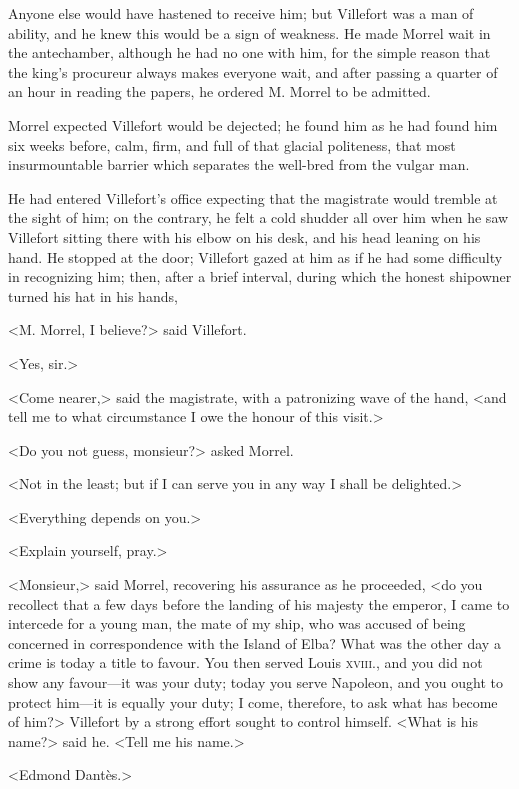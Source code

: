  Anyone else would have hastened to receive him; but Villefort was a man of ability, and he knew this would be a sign of weakness. He made Morrel wait in the antechamber, although he had no one with him, for the simple reason that the king's procureur always makes everyone wait, and after passing a quarter of an hour in reading the papers, he ordered M. Morrel to be admitted. 

 Morrel expected Villefort would be dejected; he found him as he had found him six weeks before, calm, firm, and full of that glacial politeness, that most insurmountable barrier which separates the well-bred from the vulgar man. 

 He had entered Villefort's office expecting that the magistrate would tremble at the sight of him; on the contrary, he felt a cold shudder all over him when he saw Villefort sitting there with his elbow on his desk, and his head leaning on his hand. He stopped at the door; Villefort gazed at him as if he had some difficulty in recognizing him; then, after a brief interval, during which the honest shipowner turned his hat in his hands, 

 <M. Morrel, I believe?> said Villefort. 

 <Yes, sir.> 

 <Come nearer,> said the magistrate, with a patronizing wave of the hand, <and tell me to what circumstance I owe the honour of this visit.> 

 <Do you not guess, monsieur?> asked Morrel. 

 <Not in the least; but if I can serve you in any way I shall be delighted.> 

 <Everything depends on you.> 

 <Explain yourself, pray.> 

 <Monsieur,> said Morrel, recovering his assurance as he proceeded, <do you recollect that a few days before the landing of his majesty the emperor, I came to intercede for a young man, the mate of my ship, who was accused of being concerned in correspondence with the Island of Elba? What was the other day a crime is today a title to favour. You then served Louis \textsc{xviii.}, and you did not show any favour—it was your duty; today you serve Napoleon, and you ought to protect him—it is equally your duty; I come, therefore, to ask what has become of him?>  Villefort by a strong effort sought to control himself. <What is his name?> said he. <Tell me his name.> 

 <Edmond Dantès.> 

